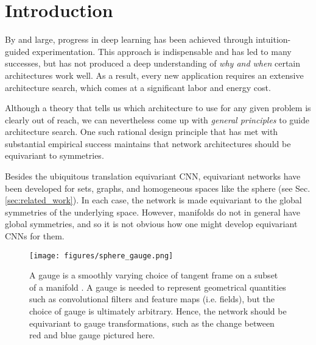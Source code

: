 \documentclass{article}
\begin{document}
\section{Introduction}

By and large, progress in deep learning has been achieved through intuition-guided experimentation.
This approach is indispensable and has led to many successes, but has not produced a deep understanding of \emph{why and when} certain architectures work well.
As a result, every new application requires an extensive architecture search, which comes at a significant labor and energy cost.

Although a theory that tells us which architecture to use for any given problem is clearly out of reach, we can nevertheless come up with \emph{general  principles} to guide architecture search.
One such rational design principle that has met with substantial empirical success  \cite{winkels3DGCNNsPulmonary2018, zaheerDeepSets2017, lunterEquivariantBayesianConvolutional2018}
maintains that network architectures should be equivariant to symmetries.

Besides the ubiquitous translation equivariant CNN, equivariant networks have been developed for sets, graphs, and homogeneous spaces like the sphere (see Sec. \ref{sec:related_work}).
In each case, the network is made equivariant to the global symmetries of the underlying space.
However, manifolds do not in general have global symmetries, and so it is not obvious how one might develop equivariant CNNs for them.

\begin{figure}[t!]
    \centering
    \texttt{[image: figures/sphere\_gauge.png]}
    \caption{A gauge is a smoothly varying choice of tangent frame on a subset  of a manifold .
    A gauge is needed to represent geometrical quantities such as convolutional filters and feature maps (i.e. fields), but the choice of gauge is ultimately arbitrary.
    Hence, the network should be equivariant to gauge transformations, such as the change between red and blue gauge pictured here.}
    \label{fig:gauge_trafo}
\end{figure}
\end{document}
